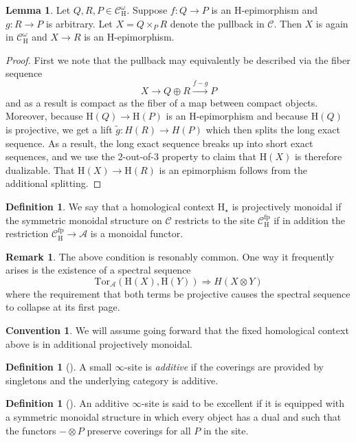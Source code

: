 \documentclass[10pt]{amsart}
\theoremstyle{definition}
\numberwithin{figure}{section}
\numberwithin{equation}{section}
\newtheorem{lemma}[figure]{Lemma}
\newtheorem{definition}[figure]{Definition}
\newtheorem{remark}[figure]{Remark}
\newtheorem{convention}[figure]{Convention}
\newcommand{\cA}{\mathcal{A}}
\newcommand{\cC}{\mathcal{C}}
\theoremstyle{cited}
\newcommand{\fp}{\mathrm{fp}}
\renewcommand{\H}{\mathrm{H}}
\newcommand{\Tor}{\mathrm{Tor}}
\begin{document}
\begin{lemma}
  \label{lem:sitepullbacks}
  Let $Q,R,P\in \cC^\omega_\H$. Suppose $f:Q\to P$ is an $\H$-epimorphism and $g:R\to P$ is arbitrary. Let $X=Q\times_P R$ denote the pullback in $\cC$. Then $X$ is again in $\cC^\omega_\H$ and $X\to R$ is an $\H$-epimorphism.
\end{lemma}

\begin{proof}
  First we note that the pullback may equivalently be described via the fiber sequence
  \[
  X\to Q\oplus R \xrightarrow{f-g} P
  \]
  and as a result is compact as the fiber of a map between compact objects. Moreover, because $\H(Q)\to \H(P)$ is an $\H$-epimorphism and because $\H(Q)$ is projective, we get a lift $\tilde g:H(R)\to H(P)$ which then splits the long exact sequence. As a result, the long exact sequence breaks up into short exact sequences, and we use the 2-out-of-3 property to claim that $\H(X)$ is therefore dualizable. That $\H(X)\to \H(R)$ is an epimorphism follows from the additional splitting.
\end{proof}

\begin{definition}
  We say that a homological context $\H_\star$ is projectively monoidal if 
  the symmetric monoidal structure on $\cC$ restricts to the site $\cC^\fp_\H$ if in addition the restriction $\cC^\fp_\H\to \cA$ is a monoidal functor.
\end{definition}

\begin{remark}
  The above condition is resonably common. One way it frequently arises is the existence of a spectral sequence 
  \[
  \Tor_{\cA}(\H(X),\H(Y))\Rightarrow H(X\otimes Y)
  \]
  where the requirement that both terms be projective causes the spectral sequence to collapse at its first page.
\end{remark}

\begin{convention}\label{conv:projectivemonoidality}
  We will assume going forward that the fixed homological context above is in additional projectively monoidal.
\end{convention}

\begin{definition}[\cite{Pst22}]
  A small $\infty$-site is \textit{additive} if the coverings are provided by singletons and the underlying category is additive. 
\end{definition}

\begin{definition}[\cite{Pst22}]
  An additive $\infty$-site is said to be excellent if it is equipped with a symmetric monoidal structure in which every object has a dual and such that the functors $-\otimes P$ preserve coverings for all $P$ in the site.
\end{definition}
\end{document}

